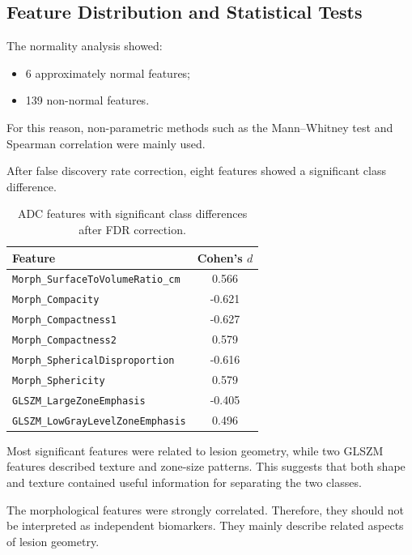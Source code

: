 \documentclass[10pt,a4paper]{article}
\begin{document}
\subsection{Feature Distribution and Statistical Tests}

The normality analysis showed:

\begin{itemize}[leftmargin=1.5em]
    \item 6 approximately normal features;
    \item 139 non-normal features.
\end{itemize}

For this reason, non-parametric methods such as the Mann--Whitney test and Spearman correlation were mainly used.

After false discovery rate correction, eight features showed a significant class difference.

\begin{table}[H]
\centering
\small
\begin{tabular}{p{8.2cm}c}
\toprule
\textbf{Feature} & \textbf{Cohen's \(d\)} \\
\midrule
\texttt{Morph\_SurfaceToVolumeRatio\_cm} & 0.566 \\
\texttt{Morph\_Compacity} & -0.621 \\
\texttt{Morph\_Compactness1} & -0.627 \\
\texttt{Morph\_Compactness2} & 0.579 \\
\texttt{Morph\_SphericalDisproportion} & -0.616 \\
\texttt{Morph\_Sphericity} & 0.579 \\
\texttt{GLSZM\_LargeZoneEmphasis} & -0.405 \\
\texttt{GLSZM\_LowGrayLevelZoneEmphasis} & 0.496 \\
\bottomrule
\end{tabular}
\caption{ADC features with significant class differences after FDR correction.}
\label{tab:adc_significant_features}
\end{table}

Most significant features were related to lesion geometry, while two GLSZM features described texture and zone-size patterns. This suggests that both shape and texture contained useful information for separating the two classes.

The morphological features were strongly correlated. Therefore, they should not be interpreted as independent biomarkers. They mainly describe related aspects of lesion geometry.
\end{document}
